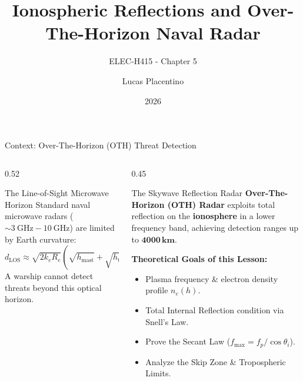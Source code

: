 \documentclass[aspectratio=169, 10pt]{beamer}
\title[Ionospheric OTH Radar Detection]{Ionospheric Reflections and Over-The-Horizon Naval Radar}
\subtitle{ELEC-H415 - Chapter 5}
\author[Lucas Placentino]{Lucas Placentino}
\institute[EPB-ULB]{
    École polytechnique de Bruxelles \\
    Université libre de Bruxelles
}
\date{2026}
\newcommand{\km}{km} %
\begin{document}
\begin{frame}
    \titlepage
\end{frame}


\begin{frame}{Context: Over-The-Horizon (OTH) Threat Detection}
    \begin{columns}[T]
        \begin{column}{0.52\textwidth}
            \begin{block}{The Line-of-Sight Microwave Horizon}
                Standard naval microwave radars ($\sim \SI{3}{\giga\hertz} - \SI{10}{\giga\hertz}$) are limited by Earth curvature:
                \begin{equation}
                    d_{\text{LOS}} \approx \sqrt{2 k_e R_e}\left(\sqrt{h_{\text{mast}}} + \sqrt{h_{\text{target}}}\right) \approx \mathbf{30 - 50\,\si{\km}}
                \end{equation}
                A warship cannot detect threats beyond this optical horizon.
            \end{block}
        \end{column}
        \begin{column}{0.45\textwidth}
            \begin{alertblock}{The Skywave Reflection Radar}
                \textbf{Over-The-Horizon (OTH) Radar} exploits total reflection on the \textbf{ionosphere} in a lower frequency band, achieving detection ranges up to $\mathbf{4000\,\si{\km}}$.
            \end{alertblock}
            \vspace{0.1cm}
            \textbf{Theoretical Goals of this Lesson:}
            \begin{itemize}
                \item Plasma frequency \& electron density profile $n_e(h)$.
                \item Total Internal Reflection condition via Snell's Law.
                \item Prove the Secant Law ($f_{\max} = f_p/\cos\theta_i$).
                \item Analyze the Skip Zone \& Tropospheric Limits.
            \end{itemize}
        \end{column}
    \end{columns}
\end{frame}
\end{document}
